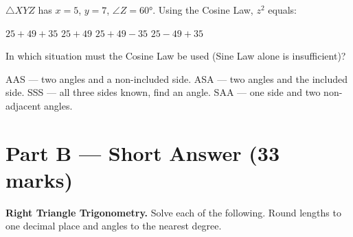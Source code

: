 \documentclass[addpoints]{exam}
\begin{document}
\begin{questions}
\question[1]
$\triangle XYZ$ has $x = 5$, $y = 7$, $\angle Z = 60°$. Using the Cosine Law, $z^2$ equals:
\begin{choices}
    \choice $25 + 49 + 35$
    \choice $25 + 49$
    \correctchoice $25 + 49 - 35$
    \choice $25 - 49 + 35$
\end{choices}

\question[1]
In which situation must the Cosine Law be used (Sine Law alone is insufficient)?
\begin{choices}
    \choice AAS — two angles and a non-included side.
    \choice ASA — two angles and the included side.
    \correctchoice SSS — all three sides known, find an angle.
    \choice SAA — one side and two non-adjacent angles.
\end{choices}

\section*{Part B --- Short Answer (33 marks)}

\question[6]
\textbf{Right Triangle Trigonometry.} Solve each of the following. Round lengths to one decimal place and angles to the nearest degree.

\end{questions}
\end{document}
